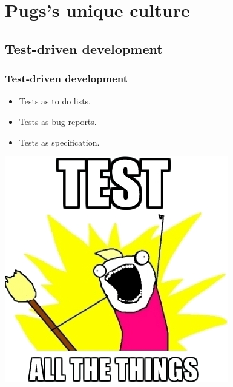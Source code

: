 \documentclass[12pt,compress,english,utf8,t]{beamer}
\begin{document}
%
%
%
%
%
%


\section{Pugs's unique culture}


\subsection{Test-driven development}

\begin{frame}\frametitle{Test-driven development}
  \begin{itemize}
    \item Tests as to do lists.
    \item Tests as bug reports.
    \item Tests as specification.
  \end{itemize}

  \begin{center}
    \includegraphics[scale=0.5]{images/test-all-the-things.jpeg}
  \end{center}
\end{frame}
\end{document}
